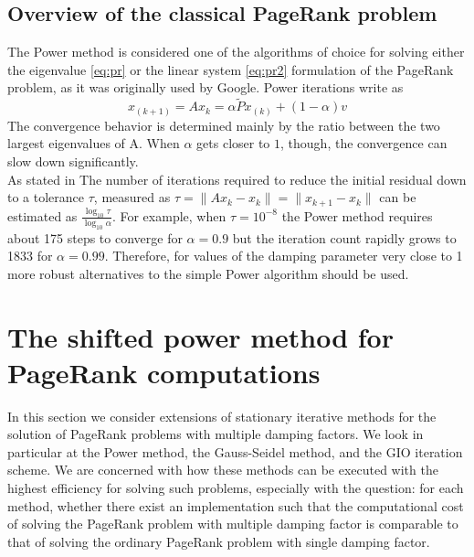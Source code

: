 \documentclass[12pt]{article}
\begin{document}
\subsection{Overview of the classical PageRank problem}
The Power method is considered one of the algorithms of choice for solving either the eigenvalue \ref{eq:pr} or the linear system \ref{eq:pr2} formulation of the PageRank problem, as it was originally used by Google. Power iterations write as
\begin{equation}\label{eq:power}
    x_{(k+1)} = Ax_k =\alpha \tilde P x_{(k)} + (1 - \alpha)v
\end{equation}
The convergence behavior is determined mainly by the ratio between the two largest eigenvalues of A. When $\alpha$ gets closer to $1$, though, the convergence can slow down significantly. \\

\noindent As stated in \cite{SHEN2022126799} The number of iterations required to reduce the initial residual down to a tolerance $\tau$, measured as $\tau = \lVert Ax_k - x_k \rVert = \lVert x_{k+1} - x_k \rVert$ can be estimated as $\frac{\log_{10} \tau}{\log_{10} \alpha}$. For example, when $\tau = 10^{-8}$ the Power method requires about 175 steps to converge for $\alpha = 0.9$ but the iteration count rapidly grows to 1833 for $\alpha = 0.99$. Therefore, for values of the damping parameter very close to 1 more robust alternatives to the simple Power algorithm should be used.

\clearpage
\section{The shifted power method for PageRank computations}
In this section we consider extensions of stationary iterative methods for the solution of PageRank problems with multiple damping factors. We look in particular at the Power method, the Gauss-Seidel method, and the GIO iteration scheme. We are concerned with how these methods can be executed with the highest efficiency for solving such problems, especially with the question: for each method, whether there exist an implementation such that the computational cost of solving the PageRank problem with multiple damping factor is comparable to that of solving the ordinary PageRank problem with single damping factor.
\end{document}
